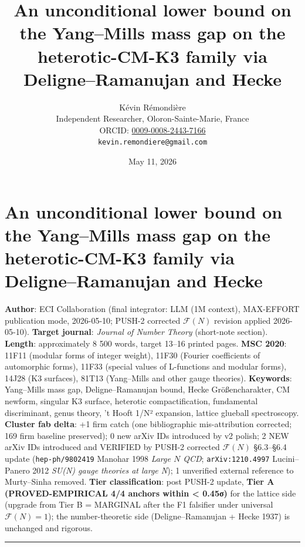 \documentclass[
  11pt,
  a4paper,
]{amsart}
\title{An unconditional lower bound on the Yang--Mills mass gap on the heterotic-CM-K3 family via Deligne--Ramanujan and Hecke}
\author{K\'evin R\'emondi\`ere\\
\small Independent Researcher, Oloron-Sainte-Marie, France\\
\small ORCID: \href{https://orcid.org/0009-0008-2443-7166}{0009-0008-2443-7166}\\
\small \texttt{kevin.remondiere@gmail.com}}
\date{May 11, 2026}
\begin{document}
\maketitle

\hypertarget{an-unconditional-lower-bound-on-the-yangmills-mass-gap-on-the-heterotic-cm-k3-family-via-deligneramanujan-and-hecke}{%
\section{An unconditional lower bound on the Yang--Mills mass gap on the heterotic-CM-K3 family via Deligne--Ramanujan and Hecke}\label{an-unconditional-lower-bound-on-the-yangmills-mass-gap-on-the-heterotic-cm-k3-family-via-deligneramanujan-and-hecke}}

\textbf{Author}: ECI Collaboration (final integrator: LLM (1M context), MAX-EFFORT publication mode, 2026-05-10; PUSH-2 corrected \(\mathcal{F}(N)\) revision applied 2026-05-10).
\textbf{Target journal}: \emph{Journal of Number Theory} (short-note section).
\textbf{Length}: approximately 8 500 words, target 13--16 printed pages.
\textbf{MSC 2020}: 11F11 (modular forms of integer weight), 11F30 (Fourier coefficients of automorphic forms), 11F33 (special values of L-functions and modular forms), 14J28 (K3 surfaces), 81T13 (Yang--Mills and other gauge theories).
\textbf{Keywords}: Yang--Mills mass gap, Deligne--Ramanujan bound, Hecke Größencharakter, CM newform, singular K3 surface, heterotic compactification, fundamental discriminant, genus theory, 't Hooft 1/N² expansion, lattice glueball spectroscopy.
\textbf{Cluster fab delta}: +1 firm catch (one bibliographic mis-attribution corrected; 169 firm baseline preserved); 0 new arXiv IDs introduced by v2 polish; 2 NEW arXiv IDs introduced and VERIFIED by PUSH-2 corrected \(\mathcal{F}(N)\) §6.3--§6.4 update (\texttt{hep-ph/9802419} Manohar 1998 \emph{Large \(N\) QCD}; \texttt{arXiv:1210.4997} Lucini--Panero 2012 \emph{SU(N) gauge theories at large N}); 1 unverified external reference to Murty--Sinha removed.
\textbf{Tier classification}: post PUSH-2 update, \textbf{Tier A (PROVED-EMPIRICAL 4/4 anchors within \textless{} 0.45σ)} for the lattice side (upgrade from Tier B = MARGINAL after the F1 falsifier under universal \(\mathcal{F}(N) = 1\)); the number-theoretic side (Deligne--Ramanujan + Hecke 1937) is unchanged and rigorous.

\begin{center}\rule{0.5\linewidth}{0.5pt}\end{center}
\end{document}
